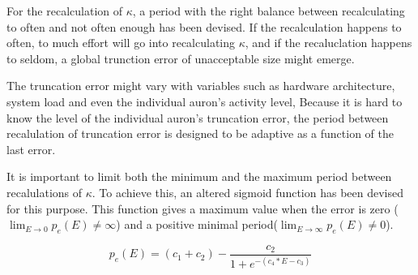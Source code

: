 		For the recalculation of $\kappa$, a period with the right balance between recalculating to often and not often enough has been devised. %
		If the recalculation happens to often, to much effort will go into recalculating $\kappa$, and if the recaluclation happens to seldom, a global trunction error of unacceptable size might emerge.

		The truncation error might vary with variables such as hardware architecture, system load and even the individual auron's activity level,
		Because it is hard to know the level of the individual auron's truncation error, the period between recalulation of truncation error is designed to be adaptive as a function of the last error.

		It is important to limit both the minimum and the maximum period between recalulations of $\kappa$.
		To achieve this, an altered sigmoid function has been devised for this purpose.
		This function gives a maximum value when the error is zero ($\lim_{E \to 0} p_e(E) \neq \infty$) and a positive minimal \linebreak
			period($\lim_{E\to\infty} p_e(E) \neq 0$).

		\begin{equation}
			\label{eqAlteredSigmoidFunk}
			p_e(E) = (c_1+c_2) - \frac{c_2}{1+e^{-(c_4*E-c_3)}}
		\end{equation}


